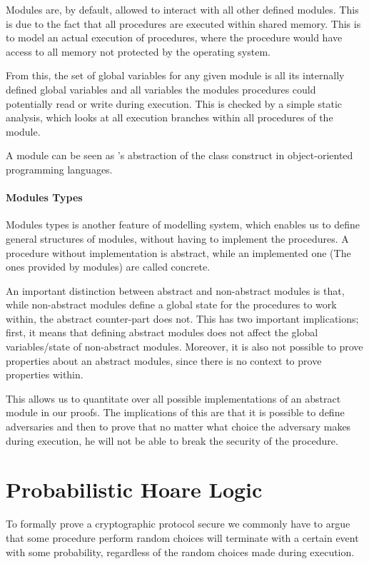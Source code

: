 Modules are, by default, allowed to interact with all other defined modules.
This is due to the fact that all procedures are executed within shared memory. This is to
model an actual execution of procedures, where the procedure would have access to
all memory not protected by the operating system.

From this, the set of global variables for any given module is all its
internally defined global variables and all variables the modules procedures
could potentially read or write during execution. This is checked by a simple
static analysis, which looks at all execution branches within all procedures of the module.

A module can be seen as \easycrypt's abstraction of the class construct
in object-oriented programming languages.

\paragraph{Modules Types}
\label{sec:ec_module_types}
Modules types is another feature of \easycrypt modelling system, which
enables us to define general structures of modules, without having to implement
the procedures. A procedure without implementation is abstract, while
an implemented one (The ones provided by modules) are called concrete.

An important distinction between abstract and non-abstract modules is that,
while non-abstract modules define a global state for the procedures to work
within, the abstract counter-part does not. This has two important implications;
first, it means that defining abstract modules does not affect the global
variables/state of non-abstract modules.
Moreover, it is also not possible to prove properties about an abstract modules, since
there is no context to prove properties within.

This allows us to quantitate over all possible implementations of an abstract
module in our proofs. The implications of this are that it is possible to
define adversaries and then to prove that no matter what choice the adversary
makes during execution, he will not be able to break the security of the procedure.


\section{Probabilistic Hoare Logic}
\label{sec:pHL}
To formally prove a cryptographic protocol secure we commonly have to argue
that some procedure perform random choices will terminate with a certain event
with some probability, regardless of the random choices made during execution.

